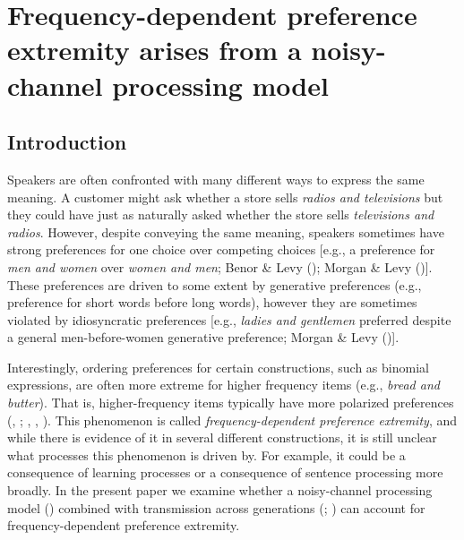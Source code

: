 \documentclass[
  12pt,
  letterpaper,
]{scrreprt}
\begin{document}

\chapter{Frequency-dependent preference extremity arises from a
noisy-channel processing
model}\label{frequency-dependent-preference-extremity-arises-from-a-noisy-channel-processing-model}

\section{Introduction}\label{introduction-5}

Speakers are often confronted with many different ways to express the
same meaning. A customer might ask whether a store sells \emph{radios
and televisions} but they could have just as naturally asked whether the
store sells \emph{televisions and radios}. However, despite conveying
the same meaning, speakers sometimes have strong preferences for one
choice over competing choices {[}e.g., a preference for
\emph{men and women} over \emph{women and men}; Benor \& Levy
(); Morgan \& Levy
(){]}. These
preferences are driven to some extent by generative preferences (e.g.,
preference for short words before long words), however they are
sometimes violated by idiosyncratic preferences {[}e.g.,
\emph{ladies and
gentlemen} preferred despite a general men-before-women generative
preference; Morgan \& Levy
(){]}.

Interestingly, ordering preferences for certain constructions, such as
binomial expressions, are often more extreme for higher frequency items
(e.g., \emph{bread and butter}). That is, higher-frequency items
typically have more polarized preferences
(,
;
,
,
).
This phenomenon is called
\emph{frequency-dependent preference extremity}, and while there is
evidence of it in several different constructions, it is still unclear
what processes this phenomenon is driven by. For example, it could be a
consequence of learning processes or a consequence of sentence
processing more broadly. In the present paper we examine whether a
noisy-channel processing model
() combined with transmission across generations
(; ) can account for frequency-dependent preference
extremity.
\end{document}
